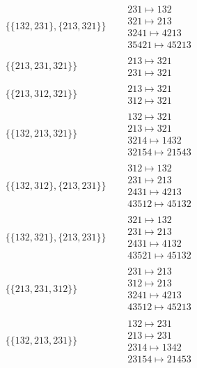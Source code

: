 \begin{tiny}
\begin{align}
\begin{matrix}
\end{matrix}
\\
\{\{132, 231\}, \{213, 321\}\}
\quad
&
\begin{matrix}
231 \mapsto 132\\321 \mapsto 213\\3241 \mapsto 4213\\35421 \mapsto 45213
\end{matrix}
\\
\{\{213, 231, 321\}\}
\quad
&
\begin{matrix}
213 \mapsto 321\\231 \mapsto 321
\end{matrix}
\\
\{\{213, 312, 321\}\}
\quad
&
\begin{matrix}
213 \mapsto 321\\312 \mapsto 321
\end{matrix}
\\
\{\{132, 213, 321\}\}
\quad
&
\begin{matrix}
132 \mapsto 321\\213 \mapsto 321\\3214 \mapsto 1432\\32154 \mapsto 21543
\end{matrix}
\\
\{\{132, 312\}, \{213, 231\}\}
\quad
&
\begin{matrix}
312 \mapsto 132\\231 \mapsto 213\\2431 \mapsto 4213\\43512 \mapsto 45132
\end{matrix}
\\
\{\{132, 321\}, \{213, 231\}\}
\quad
&
\begin{matrix}
321 \mapsto 132\\231 \mapsto 213\\2431 \mapsto 4132\\43521 \mapsto 45132
\end{matrix}
\\
\{\{213, 231, 312\}\}
\quad
&
\begin{matrix}
231 \mapsto 213\\312 \mapsto 213\\3241 \mapsto 4213\\43512 \mapsto 45213
\end{matrix}
\\
\{\{132, 213, 231\}\}
\quad
&
\begin{matrix}
132 \mapsto 231\\213 \mapsto 231\\2314 \mapsto 1342\\23154 \mapsto 21453

\end{matrix}
\end{align}
\end{tiny}
